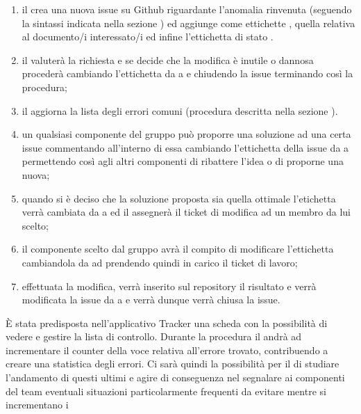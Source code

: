 	        \begin{enumerate}
	            \item il  crea una nuova issue su Github riguardante l'anomalia rinvenuta (seguendo la sintassi indicata nella sezione ) ed aggiunge come ettichette , quella relativa al documento/i interessato/i ed infine l'ettichetta di stato .
	            \item il  valuterà la richiesta e se decide che la modifica è inutile o dannosa procederà cambiando l'ettichetta da  a  e chiudendo la issue terminando così la procedura;
	            \item il  aggiorna la lista degli errori comuni (procedura descritta nella sezione ).
	            \item un qualsiasi componente del gruppo può proporre una soluzione ad una certa issue commentando all'interno di essa cambiando l'ettichetta della issue da  a  permettendo così agli altri componenti di ribattere l'idea o di proporne una nuova;
	            \item quando si è deciso che la soluzione proposta sia quella ottimale l'etichetta verrà cambiata da  a  ed il  assegnerà il ticket di modifica ad un membro da lui scelto;
	            \item il componente scelto dal gruppo avrà il compito di modificare l'ettichetta cambiandola da  ad  prendendo quindi in carico il ticket di lavoro;
	            \item effettuata la modifica, verrà inserito sul repository il risultato e verrà modificata la issue da  a  e verrà dunque verrà chiusa la issue.
        \end{enumerate}
		\label{sec:tracciamento}
			È stata predisposta nell'applicativo Tracker una scheda con la possibilità di vedere e gestire la lista di controllo. Durante la procedura 
			il  andrà ad incrementare il counter della voce relativa all'errore trovato, contribuendo a creare una statistica 
			degli errori. Ci sarà quindi la possibilità per il  di studiare l'andamento di questi ultimi e agire 
			di conseguenza nel segnalare ai componenti del team eventuali situazioni particolarmente frequenti da evitare mentre si incrementano i 
